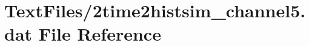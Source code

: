\hypertarget{2time2histsim__channel5_8dat}{}\section{Text\+Files/2time2histsim\+\_\+channel5.dat File Reference}
\label{2time2histsim__channel5_8dat}
